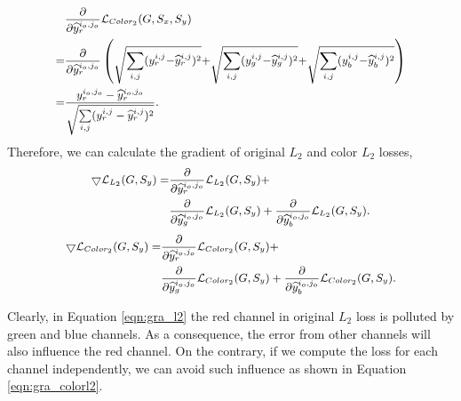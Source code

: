 \documentclass[sigconf]{acmart}
\begin{document}
\begin{equation} \small
\begin{aligned}
& \frac{\partial}{\partial \widehat{y}_r^{i_o,j_o}} \mathcal{L}_{Color_{2}}(G, S_x, S_y) \\ 
= &  \frac{\partial}{\partial \widehat{y}_r^{i_o,j_o}}\left( \sqrt{\sum_{i,j}(y_r^{i,j} {-} \widehat{y}_r^{i,j})^2} {+} \sqrt{\sum_{i,j}(y_g^{i,j} {-} \widehat{y}_g^{i,j})^2} {+} \sqrt{\sum_{i,j}(y_b^{i,j} {-} \widehat{y}_b^{i,j})^2} \right) \\ 
= & \frac{y_r^{i_o,j_o}-\widehat{y}_r^{i_o,j_o}}{\sqrt{\sum\limits_{i,j}(y_r^{i,j}-\widehat{y}_r^{i,j})^2}}. 
\end{aligned}
\label{eqn:gra_colorl2}
\end{equation}
Therefore, we can calculate the gradient of original $L_2$ and color $L_2$ losses, 
\begin{equation}\small
\begin{aligned}
\bigtriangledown \mathcal{L}_{L_2}(G, S_y) = &\frac{\partial}{\partial \widehat{y}_r^{i_o,j_o}}\mathcal{L}_{L_2}(G, S_y) + \\
& \frac{\partial}{\partial \widehat{y}_g^{i_o,j_o}}\mathcal{L}_{L_2}(G, S_y) + \frac{\partial}{\partial \widehat{y}_b^{i_o,j_o}}\mathcal{L}_{L_2}(G, S_y).
\end{aligned}
\end{equation}
\vspace{-0.2cm}
\begin{equation}\small
\begin{aligned}
\bigtriangledown \mathcal{L}_{Color_{2}}(G, S_y) = & \frac{\partial}{\partial \widehat{y}_r^{i_o,j_o}} \mathcal{L}_{Color_{2}}(G, S_y) + \\
& \frac{\partial}{\partial \widehat{y}_g^{i_o,j_o}} \mathcal{L}_{Color_{2}}(G, S_y) +
\frac{\partial}{\partial \widehat{y}_b^{i_o,j_o}} \mathcal{L}_{Color_{2}}(G, S_y).
\end{aligned}
\end{equation}

Clearly, in Equation \ref{eqn:gra_l2} the red channel in original $L_2$ loss is polluted by green and blue channels. As a consequence, the error from other channels will also influence the red channel. 
On the contrary, if we compute the loss for each channel independently, we can avoid such influence as shown in Equation \ref{eqn:gra_colorl2}.
\end{document}
